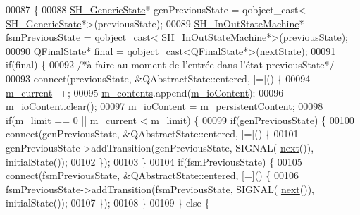 \begin{DoxyCode}
00087 \{
00088     \hyperlink{classSH__GenericState}{SH\_GenericState}* genPreviousState = qobject\_cast<
      \hyperlink{classSH__GenericState}{SH\_GenericState}*>(previousState);
00089     \hyperlink{classSH__InOutStateMachine}{SH\_InOutStateMachine}* fsmPreviousState = qobject\_cast<
      \hyperlink{classSH__InOutStateMachine}{SH\_InOutStateMachine}*>(previousState);
00090     QFinalState* \textcolor{keyword}{final} = qobject\_cast<QFinalState*>(nextState);
00091     \textcolor{keywordflow}{if}(\textcolor{keyword}{final}) \{
00092         \textcolor{comment}{/*à faire au moment de l'entrée dans l'état previousState*/}
00093         connect(previousState, &QAbstractState::entered, [=]() \{
00094             \hyperlink{classSh__LoopingInOutStateMachine_a6bcf7bcfe684dbd4d11ed327948e161b}{m\_current}++;
00095             \hyperlink{classSh__LoopingInOutStateMachine_a267e7cbcb3d6a137e2a4e1f93fb57e68}{m\_contents}.append(\hyperlink{classSH__InOutStateMachine_a661a1c7bd3b1086b3b5cd60ca957ecbd}{m\_ioContent});
00096             \hyperlink{classSH__InOutStateMachine_a661a1c7bd3b1086b3b5cd60ca957ecbd}{m\_ioContent}.clear();
00097             \hyperlink{classSH__InOutStateMachine_a661a1c7bd3b1086b3b5cd60ca957ecbd}{m\_ioContent} = \hyperlink{classSh__LoopingInOutStateMachine_ad9c0db5b057a6ba340ffcaddce60d6da}{m\_persistentContent};
00098             \textcolor{keywordflow}{if}(\hyperlink{classSh__LoopingInOutStateMachine_a320ece6cf74c2667c70059b9421117fb}{m\_limit} == 0 || \hyperlink{classSh__LoopingInOutStateMachine_a6bcf7bcfe684dbd4d11ed327948e161b}{m\_current} < \hyperlink{classSh__LoopingInOutStateMachine_a320ece6cf74c2667c70059b9421117fb}{m\_limit}) \{
00099                 \textcolor{keywordflow}{if}(genPreviousState) \{
00100                     connect(genPreviousState, &QAbstractState::entered, [=]() \{
00101                         genPreviousState->addTransition(genPreviousState, SIGNAL(
      \hyperlink{classSH__InOutStateMachine_a9cd7dbaf4da10a65d788a5d85397bebe}{next}()), initialState());
00102                     \});
00103                 \}
00104                 \textcolor{keywordflow}{if}(fsmPreviousState) \{
00105                     connect(fsmPreviousState, &QAbstractState::entered, [=]() \{
00106                         fsmPreviousState->addTransition(fsmPreviousState, SIGNAL(
      \hyperlink{classSH__InOutStateMachine_a9cd7dbaf4da10a65d788a5d85397bebe}{next}()), initialState());
00107                     \});
00108                 \}
00109             \} \textcolor{keywordflow}{else} \{

\end{DoxyCode}

